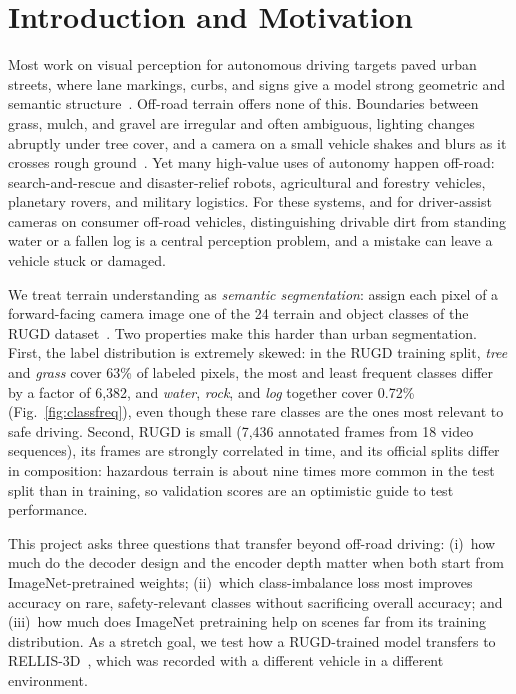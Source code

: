 \section{Introduction and Motivation}
\label{sec:intro}

Most work on visual perception for autonomous driving targets paved urban
streets, where lane markings, curbs, and signs give a model strong geometric
and semantic structure~\cite{cordts2016cityscapes}. Off-road terrain offers
none of this. Boundaries between grass, mulch, and gravel are irregular and
often ambiguous, lighting changes abruptly under tree cover, and a camera on a
small vehicle shakes and blurs as it crosses rough
ground~\cite{wigness2019rugd}. Yet many high-value uses of autonomy happen
off-road: search-and-rescue and disaster-relief robots, agricultural and
forestry vehicles, planetary rovers, and military logistics. For these
systems, and for driver-assist cameras on consumer off-road vehicles,
distinguishing drivable dirt from standing water or a fallen log is a central
perception problem, and a mistake can leave a vehicle stuck or damaged.

We treat terrain understanding as \emph{semantic segmentation}: assign each
pixel of a forward-facing camera image one of the 24 terrain and object
classes of the RUGD dataset~\cite{wigness2019rugd}. Two properties make this
harder than urban segmentation. First, the label distribution is extremely
skewed: in the RUGD training split, \emph{tree} and \emph{grass} cover 63\% of
labeled pixels, the most and least frequent classes differ by a factor of
6,382, and \emph{water}, \emph{rock}, and \emph{log} together cover 0.72\%
(Fig.~\ref{fig:classfreq}), even though these rare classes are the ones most
relevant to safe driving. Second, RUGD is small (7,436 annotated frames from 18
video sequences), its frames are strongly correlated in time, and its official
splits differ in composition: hazardous terrain is about nine times more common
in the test split than in training, so validation scores are an optimistic
guide to test performance.

This project asks three questions that transfer beyond off-road driving:
(i)~how much do the decoder design and the encoder depth matter when both
start from ImageNet-pretrained weights; (ii)~which class-imbalance loss most
improves accuracy on rare, safety-relevant classes without sacrificing overall
accuracy; and (iii)~how much does ImageNet pretraining help on scenes far from
its training distribution. As a stretch goal, we test how a RUGD-trained model
transfers to RELLIS-3D~\cite{jiang2021rellis}, which was recorded with a
different vehicle in a different environment.

